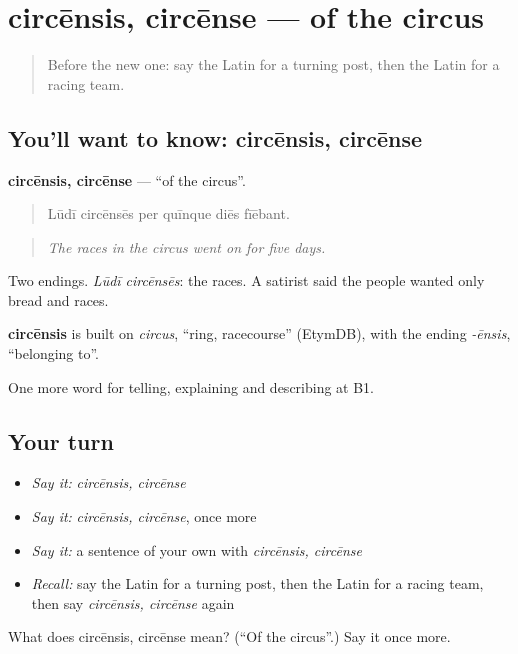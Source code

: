 \section[circēnsis, circēnse]{circēnsis, circēnse — of the circus}

\label{lesson:LA-C335-circensis}



\begin{quote}
Before the new one: say the Latin for a turning post, then the Latin for a racing team.
\end{quote}

\subsection*{You'll want to know: circēnsis, circēnse}
\textbf{circēnsis, circēnse} — \textquotedblleft{}of the circus\textquotedblright{}.

\begin{quote}
Lūdī circēnsēs per quīnque diēs fīēbant.
\end{quote}

\begin{quote}
\emph{The races in the circus went on for five days.}
\end{quote}

Two endings. \emph{Lūdī circēnsēs}: the races. A satirist said the people wanted only bread and races.

\begin{cousinweb}
\textbf{circēnsis} is built on \emph{circus}, \textquotedblleft{}ring, racecourse\textquotedblright{} (EtymDB), with the ending \emph{-ēnsis}, \textquotedblleft{}belonging to\textquotedblright{}.
\end{cousinweb}

\begin{grammarlens}[title={What you've built}]
One more word for telling, explaining and describing at B1.
\end{grammarlens}

\subsection*{Your turn}
\begin{itemize}
\raggedright
  \item \emph{Say it:} \emph{circēnsis, circēnse}
  \item \emph{Say it:} \emph{circēnsis, circēnse}, once more
  \item \emph{Say it:} a sentence of your own with \emph{circēnsis, circēnse}
  \item \emph{Recall:} say the Latin for a turning post, then the Latin for a racing team, then say \emph{circēnsis, circēnse} again
\end{itemize}

\begin{tcolorbox}[breakable,colback=teal!4,colframe=teal!35!black,title={Before you move on}]
What does circēnsis, circēnse mean? (\textquotedblleft{}Of the circus\textquotedblright{}.) Say it once more.
\end{tcolorbox}
